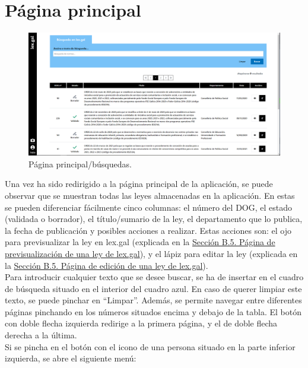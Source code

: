 \section{Página principal}
\label{PPrincipal}

\begin{figure}[H]
\centerline{\includegraphics[width=15cm]{figuras/manualUsuario/Principal.PNG}}
\caption{Página principal/búsquedas.}
\label{enlacePPrincipal}
\end{figure}

Una vez ha sido redirigido a la página principal de la aplicación, se puede observar que se muestran todas las leyes almacenadas en la aplicación. En estas se pueden diferenciar fácilmente cinco columnas: el número del DOG, el estado (validada o borrador), el título/sumario de la ley, el departamento que lo publica, la fecha de publicación y posibles acciones a realizar. Estas acciones son: el ojo para previsualizar la ley en lex.gal (explicada en la \hyperref[PPrevisualizacionLexGal]{Sección B.5. Página de previsualización de una ley de lex.gal}), y el lápiz para editar la ley (explicada en la \hyperref[PEdicionLexGal]{Sección B.5. Página de edición de una ley de lex.gal}). 
\\

Para introducir cualquier texto que se desee buscar, se ha de insertar en el cuadro de búsqueda situado en el interior del cuadro azul. En caso de querer limpiar este texto, se puede pinchar en ``Limpar''. Además, se permite navegar entre diferentes páginas pinchando en los números situados encima y debajo de la tabla. El botón con doble flecha izquierda redirige a la primera página, y el de doble flecha derecha a la última.
\\

Si se pincha en el botón con el icono de una persona situado en la parte inferior izquierda, se abre el siguiente menú:

